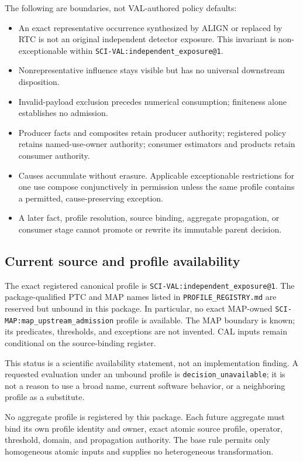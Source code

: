 The following are boundaries, not VAL-authored policy defaults:
\begin{itemize}
  \item An exact representative occurrence synthesized by ALIGN or replaced
        by RTC is not an original independent detector exposure. This
        invariant is non-exceptionable within
        \texttt{SCI-VAL:independent\_exposure@1}.
  \item Nonrepresentative influence stays visible but has no universal
        downstream disposition.
  \item Invalid-payload exclusion precedes numerical consumption; finiteness
        alone establishes no admission.
  \item Producer facts and composites retain producer authority; registered
        policy retains named-use-owner authority; consumer estimators and
        products retain consumer authority.
  \item Causes accumulate without erasure. Applicable exceptionable
        restrictions for one use compose conjunctively in permission unless
        the same profile contains a permitted, cause-preserving exception.
  \item A later fact, profile resolution, source binding, aggregate
        propagation, or consumer stage cannot promote or rewrite its immutable
        parent decision.
\end{itemize}

\subsection{Current source and profile availability}

The exact registered canonical profile is
\texttt{SCI-VAL:independent\_exposure@1}. The package-qualified PTC and MAP
names listed in \texttt{PROFILE\_REGISTRY.md} are reserved but unbound in this
package. In particular, no exact MAP-owned
\texttt{SCI-MAP:map\_upstream\_admission} profile is available. The MAP
boundary is known; its predicates, thresholds, and exceptions are not
invented. CAL inputs remain conditional on the source-binding register.

This status is a scientific availability statement, not an implementation
finding. A requested evaluation under an unbound profile is
\texttt{decision\_unavailable}; it is not a reason to use a broad name,
current software behavior, or a neighboring profile as a substitute.

No aggregate profile is registered by this package. Each future aggregate
must bind its own profile identity and owner, exact atomic source profile,
operator, threshold, domain, and propagation authority. The base rule permits
only homogeneous atomic inputs and supplies no heterogeneous transformation.


